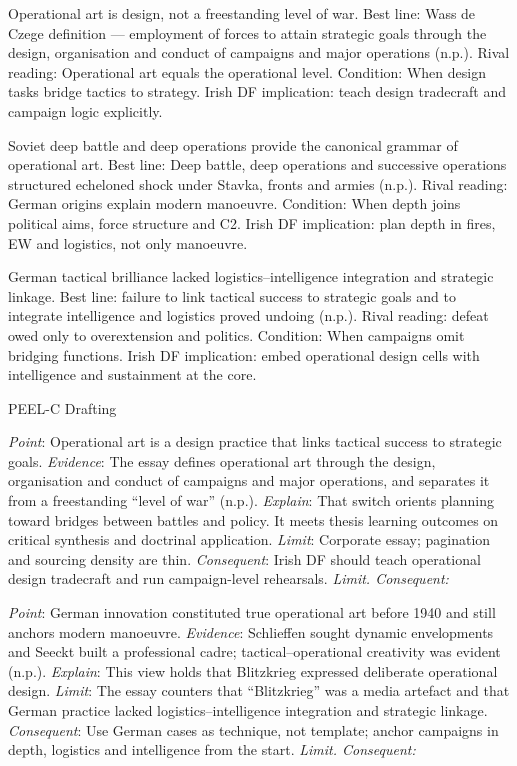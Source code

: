 Operational art is design, not a freestanding level of war.
Best line: Wass de Czege definition — employment of forces to attain strategic goals through the design, organisation and conduct of campaigns and major operations (n.p.).
Rival reading: Operational art equals the operational level.
Condition: When design tasks bridge tactics to strategy.
Irish DF implication: teach design tradecraft and campaign logic explicitly.

Soviet deep battle and deep operations provide the canonical grammar of operational art.
Best line: Deep battle, deep operations and successive operations structured echeloned shock under Stavka, fronts and armies (n.p.).
Rival reading: German origins explain modern manoeuvre.
Condition: When depth joins political aims, force structure and C2.
Irish DF implication: plan depth in fires, EW and logistics, not only manoeuvre.

German tactical brilliance lacked logistics–intelligence integration and strategic linkage.
Best line: failure to link tactical success to strategic goals and to integrate intelligence and logistics proved undoing (n.p.).
Rival reading: defeat owed only to overextension and politics.
Condition: When campaigns omit bridging functions.
Irish DF implication: embed operational design cells with intelligence and sustainment at the core.

PEEL-C Drafting

\textit{Point}: Operational art is a design practice that links tactical success to strategic goals.
\textit{Evidence}: The essay defines operational art through the design, organisation and conduct of campaigns and major operations, and separates it from a freestanding “level of war” (n.p.).
\textit{Explain}: That switch orients planning toward bridges between battles and policy. It meets thesis learning outcomes on critical synthesis and doctrinal application.
\textit{Limit}: Corporate essay; pagination and sourcing density are thin.
\textit{Consequent}: Irish DF should teach operational design tradecraft and run campaign-level rehearsals.
\textit{Limit. Consequent:}

\textit{Point}: German innovation constituted true operational art before 1940 and still anchors modern manoeuvre.
\textit{Evidence}: Schlieffen sought dynamic envelopments and Seeckt built a professional cadre; tactical–operational creativity was evident (n.p.).
\textit{Explain}: This view holds that Blitzkrieg expressed deliberate operational design.
\textit{Limit}: The essay counters that “Blitzkrieg” was a media artefact and that German practice lacked logistics–intelligence integration and strategic linkage.
\textit{Consequent}: Use German cases as technique, not template; anchor campaigns in depth, logistics and intelligence from the start.
\textit{Limit. Consequent:}

